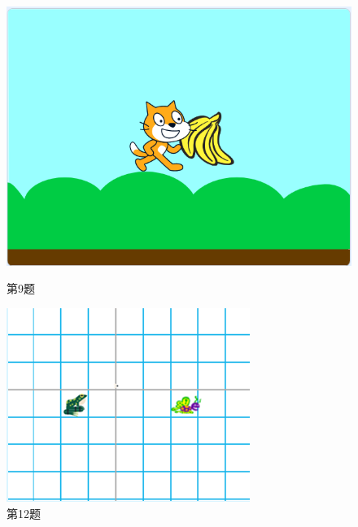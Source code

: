 \documentclass[10pt, a4paper]{article}
\begin{document}
\begin{enumerate}
\begin{figure}[htbp]
\begin{minipage}[t]{.4\textwidth}
\begin{minipage}[t]{.4\textwidth}
                \end{minipage}
                \begin{minipage}[t]{.4\textwidth}
                    \centering
                    \includegraphics[width=1\textwidth]{9-3.png}
                \end{minipage}
                \caption*{第9题}
            \end{minipage}
            \begin{minipage}[t]{.23\textwidth}
                \centering
                \includegraphics[width=.8\textwidth]{12.png}
                \caption*{第12题}
            \end{minipage}
            \begin{minipage}[t]{.09\textwidth}
                \centering

\end{minipage}
\end{figure}
\end{enumerate}
\end{document}
